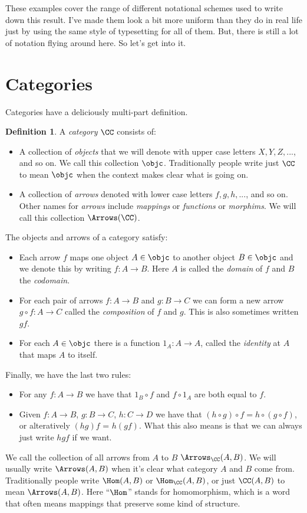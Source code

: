 \documentclass[12pt]{article}
\theoremstyle{definition}
\theoremstyle{definition}
\newtheorem{defn}{Definition}[]
\theoremstyle{definition}
\numberwithin{equation}{section}
\begin{document}
\noindent
These examples cover the range of different notational schemes used to write down this result. I've made them look a bit more uniform than they do in real life just by using the same style of typesetting for all of them. But, there is still a lot of notation flying around here. So let's get into it.

\newpage

\section{Categories}

Categories have a deliciously multi-part definition.

\begin{defn}
\label{category}
A {\it category} $\CC$ consists of:
% 
\begin{itemize}
\item 
A collection of {\it objects} that we will denote with upper case letters $X, Y, Z, ...$, and so on.  
We call this collection $\objc$. Traditionally people write just $\CC$ to mean $\objc$ when the context makes clear what is going on.
\item
A collection of {\it arrows} denoted with lower case letters $f, g, h, ...$, and so on. Other names for {\it arrows} include {\it mappings} or {\it functions} or {\it morphims}. We will call this collection $\Arrows(\CC)$.
\end{itemize}%
The objects and arrows of a category satisfy:
\begin{itemize}
\item
Each arrow $f$ maps one object $A \in \objc$ to another object $B \in \objc$ and we denote this by writing $f: A \to B$. Here $A$ is called the {\it domain} of $f$ and $B$ the {\it codomain}.

\item
For each pair of arrows $f:A \to B$ and $g : B \to C$ we can form a new arrow $g \circ f: A \to C$ called the {\it composition} of $f$ and $g$. This is also sometimes written $gf$.
\item
For each $A \in \objc$ there is a function $1_A: A \to A$, called the {\it identity} at $A$ that
maps $A$ to itself.
\end{itemize}
Finally, we have the last two rules:

\begin{itemize}
\item For any $f: A \to B$ we have that $1_B \circ f$ and $f \circ 1_A$ are both equal to $f$. 
\item Given $f: A \to B$, $g: B \to C$, $h: C\to D$ we have that $(h \circ g) \circ f = h \circ (g \circ f)$, or alteratively $(hg)f$ = $h(gf)$. What this also means is that we can always just write $hgf$ if we want.
\end{itemize}%
\end{defn}%
\noindent
We call the collection of all arrows from $A$ to $B$ $\Arrows_{\CC}(A, B)$. 
We will usually write $\Arrows(A,B)$ when it's clear what category $A$ and $B$ come from. 
Traditionally people write $\Hom(A, B)$ or $\Hom_{\CC}(A,B)$, or just $\CC(A,B)$ to mean $\Arrows(A,B)$. Here ``$\Hom$'' stands for homomorphism, which is a word that often means mappings that preserve some kind of structure.
\end{document}
